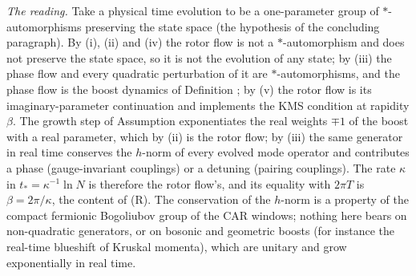 \emph{The reading.} Take a physical time evolution to be a one-parameter group of $*$-automorphisms preserving the state space (the hypothesis of the concluding paragraph). By (i), (ii) and (iv) the rotor flow is not a $*$-automorphism and does not preserve the state space, so it is not the evolution of any state; by (iii) the phase flow and every quadratic perturbation of it are $*$-automorphisms, and the phase flow is the boost dynamics of Definition ; by (v) the rotor flow is its imaginary-parameter continuation and implements the KMS condition at rapidity $\beta$. The growth step of Assumption  exponentiates the real weights $\mp 1$ of the boost with a real parameter, which by (ii) is the rotor flow; by (iii) the same generator in real time conserves the $h$-norm of every evolved mode operator and contributes a phase (gauge-invariant couplings) or a detuning (pairing couplings). The rate $\kappa$ in $t_{*} = \kappa^{-1}\ln N$ is therefore the rotor flow's, and its equality with $2\pi T$ is $\beta = 2\pi/\kappa$, the content of (R). The conservation of the $h$-norm is a property of the compact fermionic Bogoliubov group of the CAR windows; nothing here bears on non-quadratic generators, or on bosonic and geometric boosts (for instance the real-time blueshift of Kruskal momenta), which are unitary and grow exponentially in real time.

